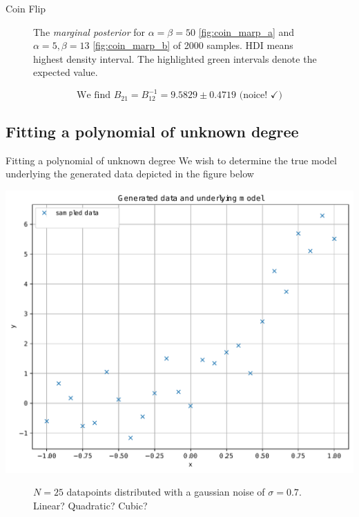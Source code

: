 \documentclass[11pt,aspectratio=1610,dvipsnames]{beamer}
\begin{document}
\begin{frame}{Coin Flip}
\begin{figure}[htbp]
\begin{subfigure}{.49\linewidth}
			\subcaption{}\label{fig:coin_marp_b}
		\end{subfigure}
		\caption{The \emph{marginal posterior} for $\alpha=\beta=50$ \eqref{fig:coin_marp_a} and $\alpha=5, \beta=13$ \eqref{fig:coin_marp_b} of 2000 samples. HDI means highest density interval. The highlighted green intervals denote the expected value.}\label{fig:coin_marp}
	\end{figure}
 $$\text{We find }B_{21}=B_{12}^{-1}=9.5829\pm0.4719  \text{ (noice! } \checkmark)$$
\end{frame}
\subsection{Fitting a polynomial of unknown degree}
\begin{frame}{Fitting a polynomial of unknown degree}
	We wish to determine the true model underlying the generated data depicted in the figure below

		\centering
		\begin{minipage}{.7\linewidth}
			\includegraphics[width=.9\linewidth]{data_regression_line_sigma_07a_data.pdf}
		\end{minipage}
		\begin{minipage}{.25\linewidth}
				\begin{figure}
						\vspace{4.5cm}
						\caption{$N=25$ datapoints distributed with a gaussian noise of $\sigma=0.7$. Linear? Quadratic? Cubic?}
				\end{figure}

		\end{minipage}

	
	
\end{frame}
\end{document}
